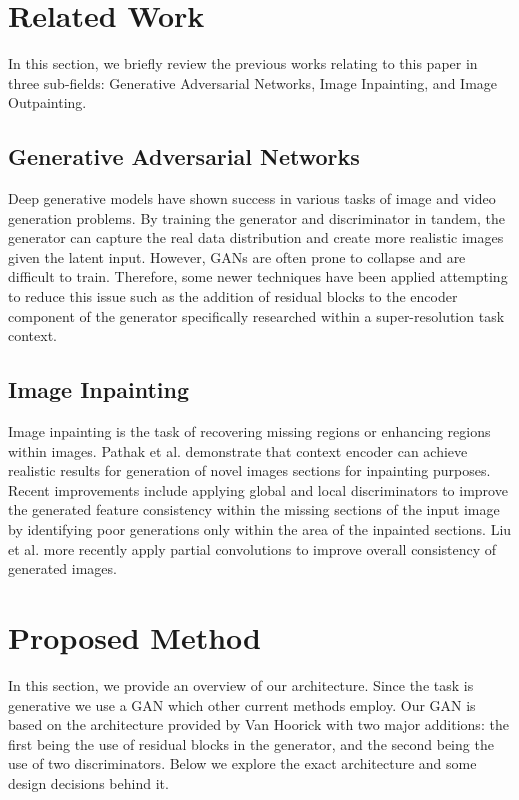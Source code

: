 \documentclass{article}
\begin{document}
\section{Related Work}
In this section, we briefly review the previous works relating to this paper in three sub-fields: Generative Adversarial Networks, Image Inpainting, and Image Outpainting.

\subsection{Generative Adversarial Networks}
Deep generative models have shown success in various tasks of image and video generation problems. By training the generator and discriminator in tandem, the generator can capture the real data distribution and create more realistic images given the latent input. However, GANs are often prone to collapse and are difficult to train. Therefore, some newer techniques have been applied attempting to reduce this issue such as the addition of residual blocks to the encoder component of the generator specifically researched within a super-resolution task context.\cite{lim_enhanced_2017}

\subsection{Image Inpainting}
Image inpainting is the task of recovering missing regions or enhancing regions within images. Pathak et al. demonstrate that context encoder can achieve realistic results for generation of novel images sections for inpainting purposes.\cite{pathak_context_2016} Recent improvements include applying global and local discriminators to improve the generated feature consistency within the missing sections of the input image by identifying poor generations only within the area of the inpainted sections.\cite{iizuka_globally_2017} Liu et al. more recently apply partial convolutions to improve overall consistency of generated images.\cite{liu_image_2018}

\section{Proposed Method}
In this section, we provide an overview of our architecture. Since the task is generative we use a GAN which other current methods employ. Our GAN is based on the architecture provided by Van Hoorick with two major additions: the first being the use of residual blocks in the generator, and the second being the use of two discriminators.\citep{van_hoorick_image_2020} Below we explore the exact architecture and some design decisions behind it.
\end{document}
